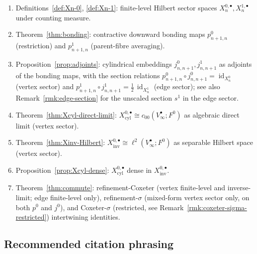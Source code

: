 \documentclass[11pt, a4paper]{amsart}
\theoremstyle{definition}
\newcommand{\id}{\operatorname{id}}
\newcommand{\inv}{\mathrm{inv}}
\newcommand{\cyl}{\mathrm{cyl}}
\begin{document}
\begin{enumerate}
\item Definitions~\ref{def:Xn-0}, \ref{def:Xn-1}: finite-level
  Hilbert sector spaces $X_n^{0, \bullet}, X_n^{1, \bullet}$
  under counting measure.
\item Theorem~\ref{thm:bonding}: contractive downward bonding maps
  $p_{n+1, n}^0$ (restriction) and $p_{n+1, n}^1$ (parent-fibre
  averaging).
\item Proposition~\ref{prop:adjoints}: cylindrical embeddings
  $j_{n, n+1}^0, j_{n, n+1}^1$ as adjoints of the bonding maps,
  with the section relations $p_{n+1, n}^0 \circ j_{n, n+1}^0 =
  \id_{X_n^0}$ (vertex sector) and
  $p_{n+1, n}^1 \circ j_{n, n+1}^1 = \tfrac{1}{2}\,\id_{X_n^1}$
  (edge sector); see also Remark~\ref{rmk:edge-section} for the
  unscaled section $s^1$ in the edge sector.
\item Theorem~\ref{thm:Xcyl-direct-limit}: $X_\cyl^{0, \bullet}
  \cong c_{00}(V_\infty^\bullet; F^0)$ as algebraic direct limit
  (vertex sector).
\item Theorem~\ref{thm:Xinv-Hilbert}: $X_\inv^{0, \bullet} \cong
  \ell^2(V_\infty^\bullet; F^0)$ as separable Hilbert space
  (vertex sector).
\item Proposition~\ref{prop:Xcyl-dense}: $X_\cyl^{0, \bullet}$
  dense in $X_\inv^{0, \bullet}$.
\item Theorem~\ref{thm:commute}: refinement-Coxeter (vertex
  finite-level and inverse-limit; edge finite-level only),
  refinement-$\sigma$ (mixed-form vertex sector only, on both
  $p^0$ and $j^0$), and Coxeter-$\sigma$ (restricted, see
  Remark~\ref{rmk:coxeter-sigma-restricted}) intertwining
  identities.
\end{enumerate}

\subsection{Recommended citation phrasing}
\end{document}
